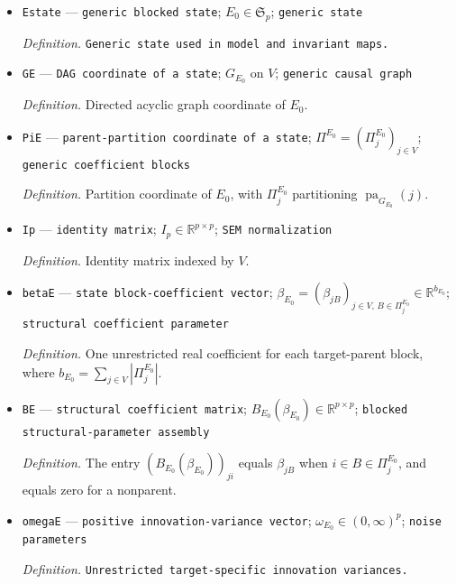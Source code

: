 \documentclass{article}
\begin{document}
\begin{itemize}
  \par\smallskip\noindent\emph{Definition.} Labelled acyclic graphs on \(V\) with one partition of each target parent set, including singleton blocks.
  \item \texttt{Estate} --- \texttt{generic blocked state}; \(E_0\in\mathfrak S_p\); \texttt{generic state}
  \par\smallskip\noindent\emph{Definition.} \texttt{Generic state used in model and invariant maps.}
  \item \texttt{GE} --- \texttt{DAG coordinate of a state}; \(G_{E_0}\) on \(V\); \texttt{generic causal graph}
  \par\smallskip\noindent\emph{Definition.} Directed acyclic graph coordinate of \(E_0\).
  \item \texttt{PiE} --- \texttt{parent-\allowbreak{}partition coordinate of a state}; \(\Pi^{E_0}=(\Pi^{E_0}_j)_{j\in V}\); \texttt{generic coefficient blocks}
  \par\smallskip\noindent\emph{Definition.} Partition coordinate of \(E_0\), with \(\Pi^{E_0}_j\) partitioning \(\operatorname{pa}_{G_{E_0}}(j)\).
  \item \texttt{Ip} --- \texttt{identity matrix}; \(I_p\in\mathbb R^{p\times p}\); \texttt{SEM normalization}
  \par\smallskip\noindent\emph{Definition.} Identity matrix indexed by \(V\).
  \item \texttt{betaE} --- \texttt{state block-\allowbreak{}coefficient vector}; \(\beta_{E_0}=(\beta_{jB})_{j\in V,\,B\in\Pi^{E_0}_j}\in\mathbb R^{b_{E_0}}\); \texttt{structural coefficient parameter}
  \par\smallskip\noindent\emph{Definition.} One unrestricted real coefficient for each target-parent block, where \(b_{E_0}=\sum_{j\in V}|\Pi^{E_0}_j|\).
  \item \texttt{BE} --- \texttt{structural coefficient matrix}; \(B_{E_0}(\beta_{E_0})\in\mathbb R^{p\times p}\); \texttt{blocked structural-\allowbreak{}parameter assembly}
  \par\smallskip\noindent\emph{Definition.} The entry \((B_{E_0}(\beta_{E_0}))_{ji}\) equals \(\beta_{jB}\) when \(i\in B\in\Pi^{E_0}_j\), and equals zero for a nonparent.
  \item \texttt{omegaE} --- \texttt{positive innovation-\allowbreak{}variance vector}; \(\omega_{E_0}\in(0,\infty)^p\); \texttt{noise parameters}
  \par\smallskip\noindent\emph{Definition.} \texttt{Unrestricted target-\allowbreak{}specific innovation variances.}

\end{itemize}
\end{document}
